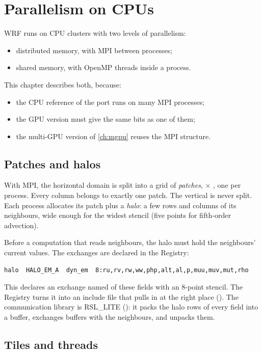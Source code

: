 \chapter{Parallelism on CPUs}\label{ch:cpupar}

WRF runs on CPU clusters with two levels of parallelism:
\begin{itemize}
  \item distributed memory, with MPI between processes;
  \item shared memory, with OpenMP threads inside a process.
\end{itemize}
This chapter describes both, because:
\begin{itemize}
  \item the CPU reference of the port runs on many MPI processes;
  \item the GPU version must give the same bits as one of them;
  \item the multi-GPU version of \cref{ch:mgpu} reuses the MPI structure.
\end{itemize}

\section{Patches and halos}

With MPI, the horizontal domain is split into a grid of \emph{patches},  $\times$ , one
per process. Every column belongs to exactly one patch. The vertical is never split. Each process allocates its
patch plus a \emph{halo}: a few rows and columns of its neighbours, wide enough for the widest stencil (five points
for fifth-order advection).

Before a computation that reads neighbours, the halo must hold the neighbours' current values. The exchanges are
declared in the Registry:
\begin{lstlisting}[language={}]
halo  HALO_EM_A  dyn_em  8:ru,rv,rw,ww,php,alt,al,p,muu,muv,mut,rho
\end{lstlisting}
This declares an exchange named  of these fields with an 8-point stencil. The Registry turns it into
an include file that  pulls in at the right place (). The communication library is
RSL\_LITE (): it packs the halo rows of every field into a buffer, exchanges buffers with the
neighbours, and unpacks them.

\section{Tiles and threads}

